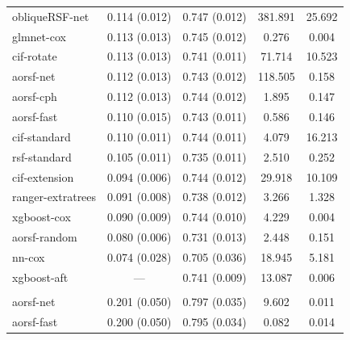 \documentclass{article}\usepackage[]{graphicx}\usepackage[]{xcolor}
\newenvironment{knitrout}{}{} %
\begin{document}
\begin{knitrout}
\begin{longtable}[t]{lcccc}
\hline
\hspace{1em}obliqueRSF-net & 0.114 (0.012) & 0.747 (0.012) & 381.891 & 25.692\\
\hspace{1em}glmnet-cox & 0.113 (0.013) & 0.745 (0.012) & 0.276 & 0.004\\
\hspace{1em}cif-rotate & 0.113 (0.013) & 0.741 (0.011) & 71.714 & 10.523\\
\hspace{1em}aorsf-net & 0.112 (0.013) & 0.743 (0.012) & 118.505 & 0.158\\
\hspace{1em}aorsf-cph & 0.112 (0.013) & 0.744 (0.012) & 1.895 & 0.147\\
\hspace{1em}aorsf-fast & 0.110 (0.015) & 0.743 (0.011) & 0.586 & 0.146\\
\hspace{1em}cif-standard & 0.110 (0.011) & 0.744 (0.011) & 4.079 & 16.213\\
\hspace{1em}rsf-standard & 0.105 (0.011) & 0.735 (0.011) & 2.510 & 0.252\\
\hspace{1em}cif-extension & 0.094 (0.006) & 0.744 (0.012) & 29.918 & 10.109\\
\hspace{1em}ranger-extratrees & 0.091 (0.008) & 0.738 (0.012) & 3.266 & 1.328\\
\hspace{1em}xgboost-cox & 0.090 (0.009) & 0.744 (0.010) & 4.229 & 0.004\\
\hspace{1em}aorsf-random & 0.080 (0.006) & 0.731 (0.013) & 2.448 & 0.151\\
\hspace{1em}nn-cox & 0.074 (0.028) & 0.705 (0.036) & 18.945 & 5.181\\
\hspace{1em}xgboost-aft & --- & 0.741 (0.009) & 13.087 & 0.006\\
\addlinespace[0.3em]
\multicolumn{5}{l}{\textit{\textbf{VA lung cancer trial; death, n = 137, p = 8}}}\\
\hline
\hspace{1em}aorsf-net & 0.201 (0.050) & 0.797 (0.035) & 9.602 & 0.011\\
\hspace{1em}aorsf-fast & 0.200 (0.050) & 0.795 (0.034) & 0.082 & 0.014\\

\end{longtable}
\end{knitrout}
\end{document}
